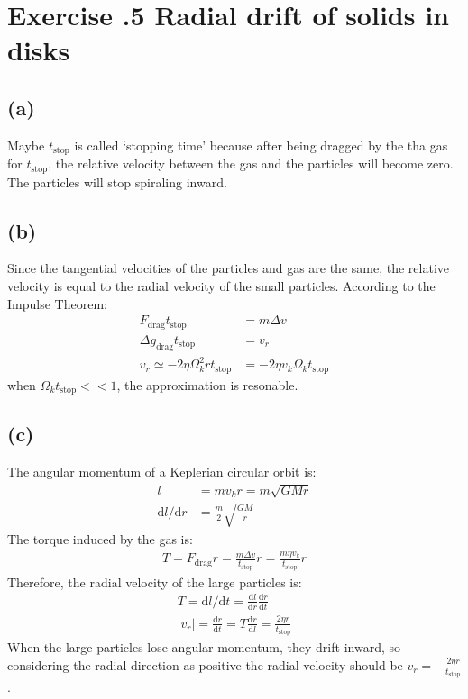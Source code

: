 \documentclass[a4paper,12pt]{article}
\renewcommand{\d}{\mathrm{d}}
\begin{document}
\section*{\textbf{Exercise \uppercase\expandafter{}.5 Radial drift of solids in disks}}
\subsection*{(a)}
Maybe $t_\text{stop}$ is called `stopping time' because after being dragged by the tha gas for $t_\text{stop}$, 
the relative velocity between the gas and the particles will become zero. The particles will stop spiraling inward. 

\subsection*{(b)}
Since the tangential velocities of the particles and gas are the same, the relative velocity is equal to 
the radial velocity of the small particles. According to the Impulse Theorem:
\begin{align*}
    F_\text{drag} t_\text{stop} &= m \Delta v \\
    \Delta g_\text{drag} t_\text{stop} &= v_r \\
    v_r \simeq -2\eta \Omega_k^2 r  t_\text{stop} &= -2\eta v_k \Omega_k t_\text{stop}
\end{align*}
when $\Omega_k t_\text{stop} << 1$, the approximation is resonable.

\subsection*{(c)}
The angular momentum of a Keplerian circular orbit is:
\begin{align*}
    l &= mv_k r = m\sqrt{GMr} \\
    \d l / \d r &= \frac{m}{2} \sqrt{\frac{GM}{r}}
\end{align*}
The torque induced by the gas is:
\begin{align*}
    T = F_\text{drag} r = \frac{m \Delta v}{t_\text{stop}} r = \frac{m \eta v_k}{t_\text{stop}} r
\end{align*}
Therefore, the radial velocity of the large particles is:
\begin{align*}
    T = \d l / \d t = \frac{\d l}{\d r} \frac{\d r}{\d t} \\
    \vert v_r \vert = \frac{\d r}{\d t} = T \frac{\d r}{\d l} = \frac{2\eta r}{t_\text{stop}}
\end{align*}
When the large particles lose angular momentum, they drift inward, so considering the radial direction as 
positive the radial velocity should be $v_r = - \frac{2\eta r}{t_\text{stop}}$.
\end{document}
